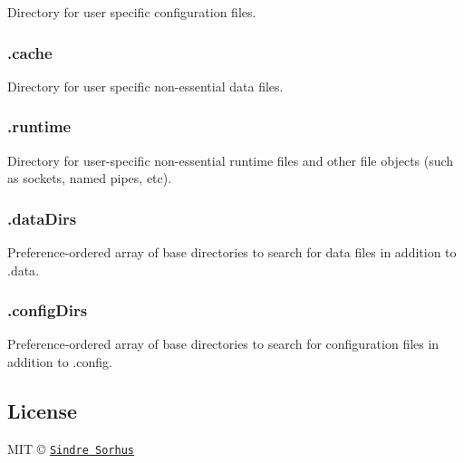 Directory for user specific configuration files.

\subsubsection*{.cache}

Directory for user specific non-\/essential data files.

\subsubsection*{.runtime}

Directory for user-\/specific non-\/essential runtime files and other file objects (such as sockets, named pipes, etc).

\subsubsection*{.data\+Dirs}

Preference-\/ordered array of base directories to search for data files in addition to {\ttfamily .data}.

\subsubsection*{.config\+Dirs}

Preference-\/ordered array of base directories to search for configuration files in addition to {\ttfamily .config}.

\subsection*{License}

M\+IT © \href{http://sindresorhus.com}{\tt Sindre Sorhus} 
